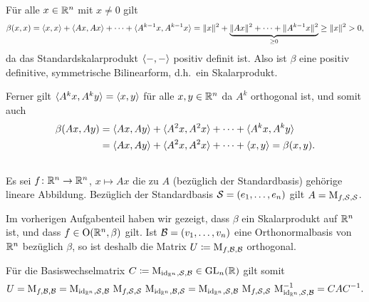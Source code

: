 \section{}





\subsection{}

Für alle $x \in \mathbb{R}^n$ mit $x \neq 0$ gilt
\[
        \beta(x,x)
  =     \langle x, x \rangle + \langle A x, A x \rangle + \dotsb + \langle A^{k-1} x, A^{k-1} x \rangle
  =     \|x\|^2 + \underbrace{ \|A x\|^2 + \dotsb + \|A^{k-1} x\|^2 }_{\geq 0}
  \geq  \|x\|^2
  >     0,
\]
da das Standardskalarprodukt $\langle -, - \rangle$ positiv definit ist.
Also ist $\beta$ eine positiv definitive, symmetrische Bilinearform, d.h.\ ein Skalarprodukt.

Ferner gilt $\langle A^k x, A^k y \rangle = \langle x, y \rangle$ für alle $x, y \in \mathbb{R}^n$ da $A^k$ orthogonal ist, und somit auch
\begin{align*}
     \beta(A x, A y)
  &= \langle A x, A y \rangle + \langle A^2 x, A^2 x \rangle + \dotsb + \langle A^k x, A^k y \rangle
  \\
  &= \langle A x, A y \rangle + \langle A^2 x, A^2 x \rangle + \dotsb + \langle x, y \rangle
   = \beta(x, y).
\end{align*}





\subsection{}

Es sei $f \colon \mathbb{R}^n \to \mathbb{R}^n$, $x \mapsto Ax$ die zu $A$ (bezüglich der Standardbasis) gehörige lineare Abbildung.
Bezüglich der Standardbasis $\mathcal{S} = (e_1, \dotsc, e_n)$ gilt $A = \operatorname{M}_{f, \mathcal{S}, \mathcal{S}}$.

Im vorherigen Aufgabenteil haben wir gezeigt, dass $\beta$ ein Skalarprodukt auf $\mathbb{R}^n$ ist, und dass $f \in \operatorname{O}(\mathbb{R}^n, \beta)$ gilt.
Ist $\mathcal{B} = (v_1, \dotsc, v_n)$ eine Orthonormalbasis von $\mathbb{R}^n$ bezüglich $\beta$, so ist deshalb die Matrix $U \coloneqq \operatorname{M}_{f, \mathcal{B}, \mathcal{B}}$ orthogonal.

Für die Basiswechselmatrix $C \coloneqq \operatorname{M}_{\operatorname{id}_{\mathbb{R}^n}, \mathcal{S}, \mathcal{B}} \in \operatorname{GL}_{n}(\mathbb{R})$ gilt somit
\[
      U
  =   \operatorname{M}_{f, \mathcal{B}, \mathcal{B}}
  =   \operatorname{M}_{\operatorname{id}_{\mathbb{R}^n}, \mathcal{S}, \mathcal{B}}
  \,  \operatorname{M}_{f, \mathcal{S}, \mathcal{S}}
  \,  \operatorname{M}_{\operatorname{id}_{\mathbb{R}^n}, \mathcal{B}, \mathcal{S}}
  =   \operatorname{M}_{\operatorname{id}_{\mathbb{R}^n}, \mathcal{S}, \mathcal{B}}
  \,  \operatorname{M}_{f, \mathcal{S}, \mathcal{S}}
  \,  \operatorname{M}_{\operatorname{id}_{\mathbb{R}^n}, \mathcal{S}, \mathcal{B}}^{-1}
  =   C A C^{-1}.
\]

